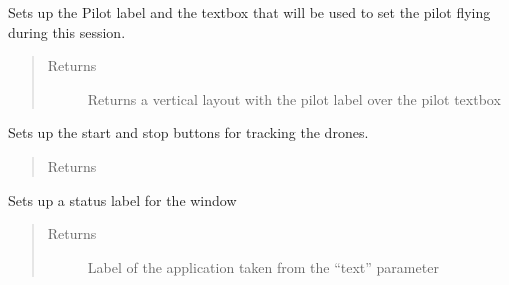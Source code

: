 \documentclass[letterpaper,10pt,english]{sphinxmanual}
\begin{document}
\begin{fulllineitems}
\begin{fulllineitems}
\label{\detokenize{index:src.Views.View_TrackingScreen.TrackingWindow.setPilot}}
Sets up the Pilot label and the textbox that will be used to set the pilot flying during this
session.
\begin{quote}\begin{description}
\item[{Returns}] \leavevmode
Returns a vertical layout with the pilot label over the pilot textbox

\end{description}\end{quote}

\end{fulllineitems}


\begin{fulllineitems}
\label{\detokenize{index:src.Views.View_TrackingScreen.TrackingWindow.setStartAndStopBtns}}
Sets up the start and stop buttons for tracking the drones.
\begin{quote}\begin{description}
\item[{Returns}] \leavevmode


\end{description}\end{quote}

\end{fulllineitems}


\begin{fulllineitems}
\label{\detokenize{index:src.Views.View_TrackingScreen.TrackingWindow.setStatusLabel}}
Sets up a status label for the window
\begin{quote}\begin{description}
\item[{Returns}] \leavevmode
Label of the application taken from the “text” parameter


\end{description}
\end{quote}
\end{fulllineitems}
\end{fulllineitems}
\end{document}
